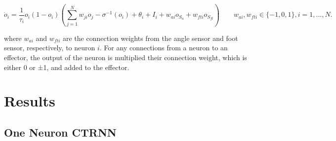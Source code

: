 \documentclass{article}
\begin{document}
\begin{equation}
  \dot{o}_i = \frac{1}{\tau_i} o_i(1 - o_i)\left(\sum_{j=1}^{N} w_{ji}o_j - \sigma^{-1}(o_i) + \theta_i + I_i + w_{ai} o_{S_{a}} + w_{fti} o_{S_{ft}} \right) \quad \quad w_{ai}, w_{fti} \in \{-1, 0, 1\}, i = 1, \dots, N.
\end{equation}

where \(w_{ai}\) and \(w_{fti}\) are the connection weights from the angle sensor and foot sensor, respectively, to neuron \(i\). For any connections from a neuron to an effector, the output of the neuron is multiplied their connection weight, which is either 0 or ±1, and added to the effector.

\section{Results}

\subsection{One Neuron CTRNN}
\end{document}
